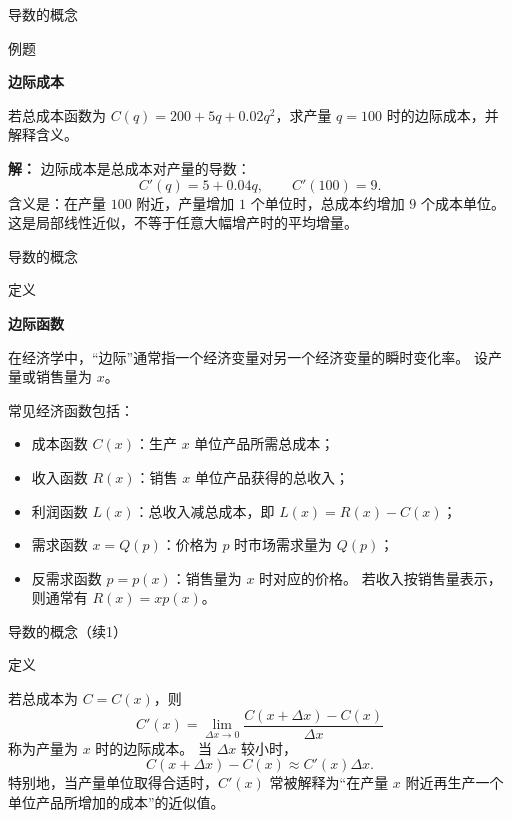 \documentclass[aspectratio=169,10pt,fontset=fandol]{ctexbeamer}
\begin{document}
\begin{frame}[t,fragile]{导数的概念}
\normalsize
\begin{block}{例题}
{\normalsize
\textbf{边际成本}\par

若总成本函数为 $C(q)=200+5q+0.02q^2$，求产量 $q=100$ 时的边际成本，并解释含义。

}
\end{block}
\pause
{\normalsize
\textbf{解：}
边际成本是总成本对产量的导数：
\[
C'(q)=5+0.04q,\qquad C'(100)=9.
\]
含义是：在产量 $100$ 附近，产量增加 $1$ 个单位时，总成本约增加 $9$ 个成本单位。 这是局部线性近似，不等于任意大幅增产时的平均增量。

}
\end{frame}
\begin{frame}[t,fragile]{导数的概念}
\normalsize
\begin{block}{定义}
{\normalsize
\textbf{边际函数}\par

在经济学中，“边际”通常指一个经济变量对另一个经济变量的瞬时变化率。 设产量或销售量为 $x$。

常见经济函数包括：
\begin{itemize}
\item 成本函数 $C(x)$：生产 $x$ 单位产品所需总成本；
\item 收入函数 $R(x)$：销售 $x$ 单位产品获得的总收入；
\item 利润函数 $L(x)$：总收入减总成本，即 $L(x)=R(x)-C(x)$；
\item 需求函数 $x=Q(p)$：价格为 $p$ 时市场需求量为 $Q(p)$；
\item 反需求函数 $p=p(x)$：销售量为 $x$ 时对应的价格。 若收入按销售量表示，则通常有 $R(x)=xp(x)$。
\end{itemize}
}
\end{block}
\end{frame}
\begin{frame}[t,fragile]{导数的概念（续1）}
\normalsize
\begin{block}{定义}
{\normalsize


若总成本为 $C=C(x)$，则
\[
C'(x)=\lim_{\Delta x\to0}\frac{C(x+\Delta x)-C(x)}{\Delta x}
\]
称为产量为 $x$ 时的边际成本。 当 $\Delta x$ 较小时，
\[
C(x+\Delta x)-C(x)\approx C'(x)\Delta x.
\]
特别地，当产量单位取得合适时，$C'(x)$ 常被解释为“在产量 $x$ 附近再生产一个单位产品所增加的成本”的近似值。


}
\end{block}
\end{frame}
\end{document}
